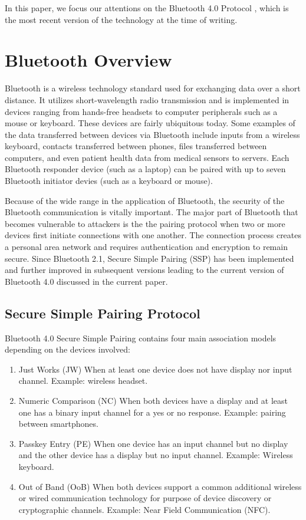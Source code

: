 \documentclass{acm_proc_article-sp}
\begin{document}
In this paper, we focus our attentions on the Bluetooth 4.0 Protocol \cite{bluetooth:sig4}, which is the most recent version of the technology at the time of writing.


\section{Bluetooth Overview}
Bluetooth is a wireless technology standard used for exchanging data over a short distance. It utilizes short-wavelength radio transmission and is implemented in devices ranging from hands-free headsets to computer peripherals such as a mouse or keyboard. These devices are fairly ubiquitous today. Some examples of the data transferred between devices via Bluetooth include inputs from a wireless keyboard, contacts transferred between phones, files transferred between computers, and even patient health data from medical sensors to servers. Each Bluetooth responder device (such as a laptop) can be paired with up to seven Bluetooth initiator devies (such as a keyboard or mouse).

Because of the wide range in the application of Bluetooth, the security of the Bluetooth communication is vitally important. The major part of Bluetooth that becomes vulnerable to attackers is the the pairing protocol when two or more devices first initiate connections with one another. The connection process creates a personal area network and requires authentication and encryption to remain secure. Since Bluetooth 2.1, Secure Simple Pairing (SSP) \cite{bluetooth:sig2} has been implemented and further improved in subsequent versions leading to the current version of Bluetooth 4.0 discussed in the current paper.

\subsection{Secure Simple Pairing Protocol}

Bluetooth 4.0 Secure Simple Pairing contains four main association models depending on the devices involved:
\begin{enumerate}[1.]
    \item{Just Works (JW)} When at least one device does not have display nor input channel. Example: wireless headset.
    \item{Numeric Comparison (NC)} When both devices have a display and at least one has a binary input channel for a yes or no response. Example: pairing between smartphones.
    \item{Passkey Entry (PE)} When one device has an input channel but no display and the other device has a display but no input channel. Example: Wireless keyboard.
    \item{Out of Band (OoB)} When both devices support a common additional wireless or wired communication technology for purpose of device discovery or cryptographic channels. Example: Near Field Communication (NFC).
\end{enumerate}
\end{document}
